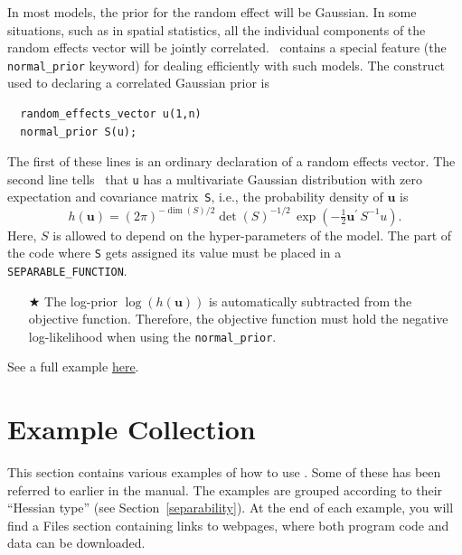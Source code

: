 \documentclass{admbmanual}
\begin{document}
In most models, the prior for the random effect will be Gaussian. In some
situations, such as in spatial statistics, all the individual components of the
random effects vector will be jointly correlated. \scAB\ contains a special
feature (the \texttt{normal\_prior} keyword) for dealing efficiently with such
models. The construct used to declaring a correlated Gaussian prior is
\begin{lstlisting}
  random_effects_vector u(1,n)
  normal_prior S(u);
\end{lstlisting}
The first of these lines is an ordinary declaration of a random effects vector.
The second line tells \scAB\ that \texttt{u} has a multivariate Gaussian
distribution with zero expectation and covariance matrix~\texttt{S}, i.e., the
probability density of $\mathbf{u}$ is
\[
h(\mathbf{u})=\left(2\pi \right)^{-\dim(S)/2}\det (S)^{-1/2}\,
\exp \left(-\tfrac{1}{2}\mathbf{u}^{\prime} \, S^{-1}u\right) .
\]
Here, $S$ is allowed to depend on the hyper-parameters of the model. The part of
the code where \texttt{S} gets assigned its value must be placed in a
\texttt{SEPARABLE\_FUNCTION}.
\begin{itemize}
  \item[$\bigstar$] The log-prior $\log \left(h\left(\mathbf{u}\right) \right)
  $ is automatically subtracted from the objective function. Therefore, the
  objective function must hold the negative log-likelihood when using the
  \texttt{normal\_prior}.
\end{itemize}
See a full example
\href{http://otter-rsch.com/admbre/examples/spatial/spatial.html}{here}.

\appendix

\chapter{Example Collection}
\label{sec:example_collection}

This section contains various examples of how to use \scAR. Some of these has
been referred to earlier in the manual. The examples are grouped according to
their ``Hessian type'' (see Section~\ref{separability}). At the end of each
example, you will find a Files section containing links to webpages, where both
program code and data can be downloaded.
\end{document}
